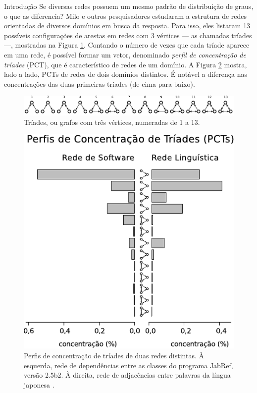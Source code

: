 \begin{section}{Introdução}
Se diversas redes possuem um mesmo padrão de distribuição de graus, o que as diferencia? Milo e outros pesquisadores \cite{Milo2002} estudaram a estrutura de redes orientadas de diversos domínios em busca da resposta. Para isso, eles listaram 13 possíveis configurações de arestas em redes com 3 vértices --- as chamadas tríades ---, mostradas na Figura \ref{fig:triades}. Contando o número de vezes que cada tríade aparece em uma rede, é possível formar um vetor, denominado \emph{perfil de concentração de tríades} (PCT), que é característico de redes de um domínio. A Figura \ref{fig:tcp} mostra, lado a lado, PCTs de redes de dois domínios distintos. É notável a diferença nas concentrações das duas primeiras tríades (de cima para baixo).

\begin{figure}[htbp]
	\centering
		\includegraphics[scale=1]{figuras/triads}
	\caption{Tríades, ou grafos com três vértices, numeradas de 1 a 13.}
	\label{fig:triades}
\end{figure}


\begin{figure}[htbp]
	\centering
		\includegraphics[scale=1]{figuras/tcp}
	\caption{Perfis de concentração de tríades de duas redes distintas. À esquerda, rede de dependências entre as classes do programa JabRef, versão 2.5b2. À direita, rede de adjacências entre palavras da língua japonesa \cite{Milo2004}.}
	\label{fig:tcp}
\end{figure}

\end{section}

